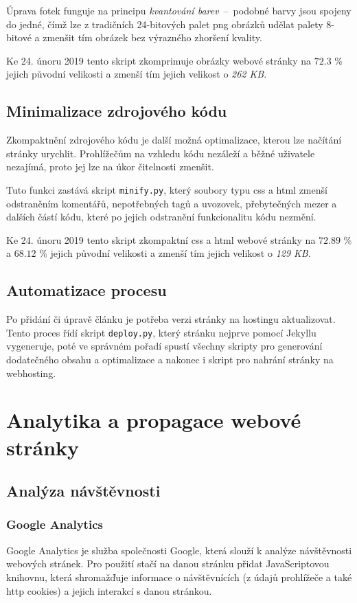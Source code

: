 \documentclass[a4paper, 12pt]{article}
\begin{document}
  Úprava fotek funguje na principu \emph{kvantování barev}~--~podobné barvy jsou spojeny do jedné, čímž lze z tradičních 24-bitových palet \gls{png} obrázků udělat palety 8-bitové a zmenšit tím obrázek bez výrazného zhoršení kvality.

  Ke 24. únoru 2019 tento skript zkomprimuje obrázky webové stránky na $72.3$ \% jejich původní velikosti a zmenší tím jejich velikost o \emph{262 KB}.


  \subsection{Minimalizace zdrojového kódu}
  Zkompaktnění zdrojového kódu je další možná optimalizace, kterou lze načítání stránky urychlit. Prohlížečům na vzhledu kódu nezáleží a běžné uživatele nezajímá, proto jej lze na úkor čitelnosti zmenšit.

  Tuto funkci zastává skript \texttt{minify.py}, který soubory typu \gls{css} a \gls{html} zmenší odstraněním komentářů, nepotřebných tagů a uvozovek, přebytečných mezer a dalších částí kódu, které po jejich odstranění funkcionalitu kódu nezmění.

  Ke 24. únoru 2019 tento skript zkompaktní \gls{css} a \gls{html} webové stránky na $72.89$ \% a $68.12$ \% jejich původní velikosti a zmenší tím jejich velikost o \emph{129 KB}.


  \subsection{Automatizace procesu}
  Po přidání či úpravě článku je potřeba verzi stránky na hostingu aktualizovat. Tento proces řídí skript \texttt{deploy.py}, který stránku nejprve pomocí Jekyllu vygeneruje, poté ve správném pořadí spustí všechny skripty pro generování dodatečného obsahu a optimalizace a nakonec i skript pro nahrání stránky na webhosting.


  \section{Analytika a propagace webové stránky}

  \subsection{Analýza návštěvnosti}

  \subsubsection{Google Analytics}
  Google Analytics je služba společnosti Google, která slouží k analýze návštěvnosti webových stránek. Pro použití stačí na danou stránku přidat JavaScriptovou knihovnu, která shromažďuje informace o návštěvnících (z údajů prohlížeče a také \gls{http} cookies) a jejich interakcí s danou stránkou.
\end{document}

